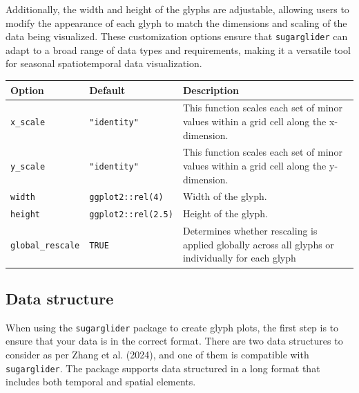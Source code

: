 Additionally, the width and height of the glyphs are adjustable, allowing users to modify the appearance of each glyph to match the dimensions and scaling of the data being visualized. These customization options ensure that \texttt{sugarglider} can adapt to a broad range of data types and requirements, making it a versatile tool for seasonal spatiotemporal data visualization.

\begin{longtable}[]{@{}
  >{\raggedright\arraybackslash}p{}
  >{\raggedright\arraybackslash}p{}
  >{\raggedright\arraybackslash}p{}@{}}
\toprule\noalign{}
\begin{minipage}[b]{\linewidth}\raggedright
Option
\end{minipage} & \begin{minipage}[b]{\linewidth}\raggedright
Default
\end{minipage} & \begin{minipage}[b]{\linewidth}\raggedright
Description
\end{minipage} \\
\midrule\noalign{}
\endhead
\bottomrule\noalign{}
\endlastfoot
\texttt{x\_scale} & \texttt{"identity"} & This function scales each set of minor values within a grid cell along the x-dimension. \\
\texttt{y\_scale} & \texttt{"identity"} & This function scales each set of minor values within a grid cell along the y-dimension. \\
\texttt{width} & \texttt{ggplot2::rel(4)} & Width of the glyph. \\
\texttt{height} & \texttt{ggplot2::rel(2.5)} & Height of the glyph. \\
\texttt{global\_rescale} & \texttt{TRUE} & Determines whether rescaling is applied globally across all glyphs or individually for each glyph \\
\end{longtable}

\subsection{Data structure}\label{data-structure}

When using the \texttt{sugarglider} package to create glyph plots, the first step is to ensure that your data is in the correct format. There are two data structures to consider as per Zhang et al. (2024), and one of them is compatible with \texttt{sugarglider}. The package supports data structured in a long format that includes both temporal and spatial elements.

